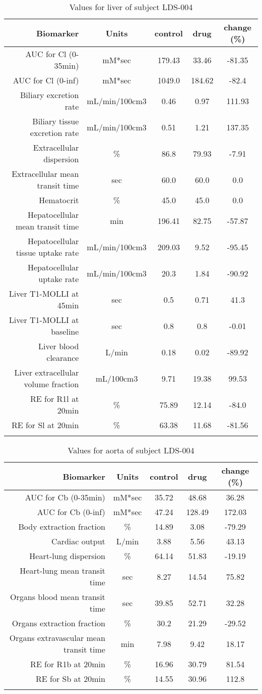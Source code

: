 \documentclass{epflreport}%
\begin{document}
%
\clearpage%
\begin{longtable}{rcccc}%
\hline%
Biomarker&Units&control&drug&change (\%)\\%
\hline%
AUC for Cl (0{-}35min)&mM*sec&179.43&33.46&{-}81.35\\%
AUC for Cl (0{-}inf)&mM*sec&1049.0&184.62&{-}82.4\\%
Biliary excretion rate&mL/min/100cm3&0.46&0.97&111.93\\%
Biliary tissue excretion rate&mL/min/100cm3&0.51&1.21&137.35\\%
Extracellular dispersion&\%&86.8&79.93&{-}7.91\\%
Extracellular mean transit time&sec&60.0&60.0&0.0\\%
Hematocrit&\%&45.0&45.0&0.0\\%
Hepatocellular mean transit time&min&196.41&82.75&{-}57.87\\%
Hepatocellular tissue uptake rate&mL/min/100cm3&209.03&9.52&{-}95.45\\%
Hepatocellular uptake rate&mL/min/100cm3&20.3&1.84&{-}90.92\\%
Liver T1{-}MOLLI at 45min&sec&0.5&0.71&41.3\\%
Liver T1{-}MOLLI at baseline&sec&0.8&0.8&{-}0.01\\%
Liver blood clearance&L/min&0.18&0.02&{-}89.92\\%
Liver extracellular volume fraction&mL/100cm3&9.71&19.38&99.53\\%
RE for R1l at 20min&\%&75.89&12.14&{-}84.0\\%
RE for Sl at 20min&\%&63.38&11.68&{-}81.56\\%
\hline%
\caption{Values for liver of subject LDS-004} \\%
\end{longtable}%
\begin{longtable}{rcccc}%
\hline%
Biomarker&Units&control&drug&change (\%)\\%
\hline%
AUC for Cb (0{-}35min)&mM*sec&35.72&48.68&36.28\\%
AUC for Cb (0{-}inf)&mM*sec&47.24&128.49&172.03\\%
Body extraction fraction&\%&14.89&3.08&{-}79.29\\%
Cardiac output&L/min&3.88&5.56&43.13\\%
Heart{-}lung dispersion&\%&64.14&51.83&{-}19.19\\%
Heart{-}lung mean transit time&sec&8.27&14.54&75.82\\%
Organs blood mean transit time&sec&39.85&52.71&32.28\\%
Organs extraction fraction&\%&30.2&21.29&{-}29.52\\%
Organs extravascular mean transit time&min&7.98&9.42&18.17\\%
RE for R1b at 20min&\%&16.96&30.79&81.54\\%
RE for Sb at 20min&\%&14.55&30.96&112.8\\%
\hline%
\caption{Values for aorta of subject LDS-004} \\%
\end{longtable}%
\clearpage%
\end{document}
